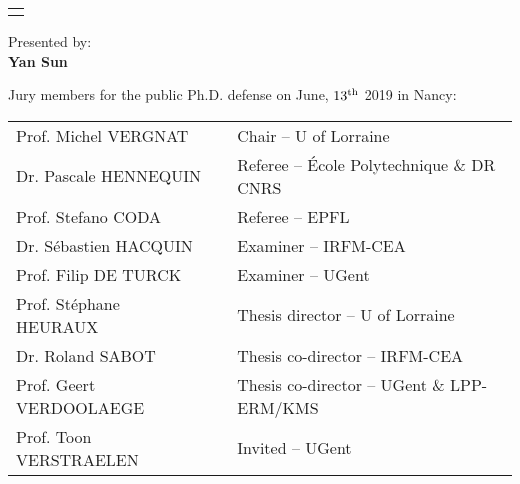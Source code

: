 \begin{titlepage}
\begin{center}
\begin{tabular}{c}



\noalign{\smallskip} \hline \hline \noalign{\smallskip}
\end{tabular}


\vspace{0.4cm}
{\Large
Presented by:\\ \vspace{.4cm}
\textbf{Yan Sun}}\\

\vspace{0.4cm}

{\normalsize Jury members for the public Ph.D. defense on June, $13^{\rm th}$ 2019} in Nancy: \\
\vspace{.4cm}
\begin{tabular}{lcl}
\hline


Prof. Michel \textsc{VERGNAT} & \hspace{0cm} & Chair -- U of Lorraine \\
Dr. Pascale \textsc{HENNEQUIN} & \hspace{0cm} & Referee -- \'{E}cole Polytechnique \& DR CNRS \\
Prof. Stefano \textsc{CODA} & \hspace{0cm} & Referee -- EPFL \\
Dr. S\'{e}bastien \textsc{HACQUIN}  & \hspace{0cm} & Examiner  -- IRFM-CEA \\
Prof. Filip \textsc{DE TURCK} & \hspace{0cm} & Examiner --  UGent \\
Prof. St\'{e}phane \textsc{HEURAUX} & \hspace{0cm} & Thesis director -- U of Lorraine \\
Dr. Roland \textsc{SABOT}  & \hspace{0cm} & Thesis co-director -- IRFM-CEA \\
Prof. Geert \textsc{VERDOOLAEGE} & \hspace{0cm} & Thesis co-director -- UGent \& LPP-ERM/KMS \\
Prof. Toon \textsc{VERSTRAELEN} & \hspace{0cm} & Invited -- UGent \\



\end{tabular}
\end{center}
\end{titlepage}
